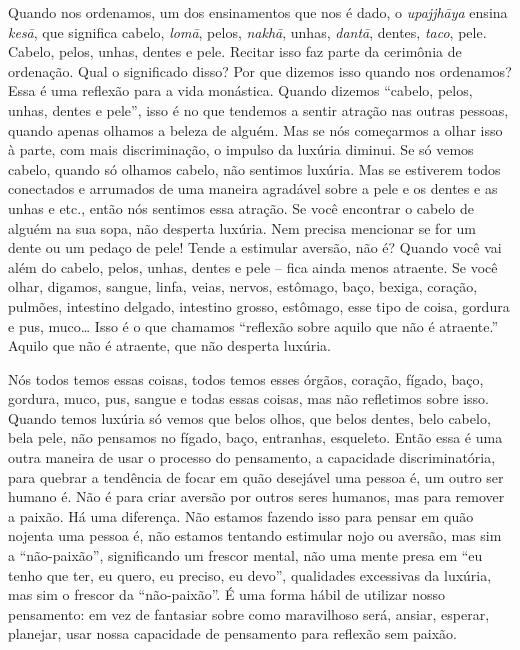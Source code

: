 Quando nos ordenamos, um dos ensinamentos que nos é dado, o
\textit{upajjhāya} ensina \textit{kesā}, que significa cabelo,
\textit{lomā}, pelos, \textit{nakhā}, unhas, \textit{dantā},
dentes, \textit{taco}, pele. Cabelo, pelos, unhas, dentes e pele.
Recitar isso faz parte da cerimônia de ordenação. Qual o significado
disso? Por que dizemos isso quando nos ordenamos? Essa é uma reflexão
para a vida monástica. Quando dizemos “cabelo, pelos, unhas, dentes e
pele”, isso é no que tendemos a sentir atração nas outras pessoas,
quando apenas olhamos a beleza de alguém. Mas se nós começarmos a olhar
isso à parte, com mais discriminação, o impulso da luxúria diminui. Se
só vemos cabelo, quando só olhamos cabelo, não sentimos luxúria. Mas se
estiverem todos conectados e arrumados de uma maneira agradável sobre a
pele e os dentes e as unhas e etc., então nós sentimos essa atração. Se
você encontrar o cabelo de alguém na sua sopa, não desperta luxúria.
Nem precisa mencionar se for um dente ou um pedaço de pele! Tende a
estimular aversão, não é? Quando você vai além do cabelo, pelos, unhas,
dentes e pele – fica ainda menos atraente. Se você olhar, digamos,
sangue, linfa, veias, nervos, estômago, baço, bexiga, coração, pulmões,
intestino delgado, intestino grosso, estômago, esse tipo de coisa,
gordura e pus, muco… Isso é o que chamamos “reflexão sobre aquilo que
não é atraente.” Aquilo que não é atraente, que não desperta luxúria. 

Nós todos temos essas coisas, todos temos esses órgãos, coração,
fígado, baço, gordura, muco, pus, sangue e todas essas coisas, mas não
refletimos sobre isso. Quando temos luxúria só vemos que belos olhos,
que belos dentes, belo cabelo, bela pele, não pensamos no fígado, baço,
entranhas, esqueleto. Então essa é uma outra maneira de usar o processo
do pensamento, a capacidade discriminatória, para quebrar a tendência
de focar em quão desejável uma pessoa é, um outro ser humano é. Não é
para criar aversão por outros seres humanos, mas para remover a paixão.
Há uma diferença. Não estamos fazendo isso para pensar em quão nojenta
uma pessoa é, não estamos tentando estimular nojo ou aversão, mas sim a
“não-paixão”, significando um frescor mental, não uma mente presa em
“eu tenho que ter, eu quero, eu preciso, eu devo”, qualidades
excessivas da luxúria, mas sim o frescor da “não-paixão”. É uma forma
hábil de utilizar nosso pensamento: em vez de fantasiar sobre como
maravilhoso será, ansiar, esperar, planejar, usar nossa capacidade de
pensamento para reflexão sem paixão. 

